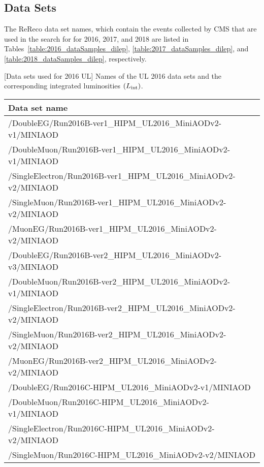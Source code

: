 \subsection{Data Sets}
\label{sec:datasets_dilep}
The ReReco data set names, which contain the events collected by CMS that are used in the search for \PZD for 2016, 2017, and 2018 are listed in Tables~\ref{table:2016_dataSamples_dilep}, \ref{table:2017_dataSamples_dilep}, and \ref{table:2018_dataSamples_dilep}, respectively.
\begin{table}[h]
    \small
    \centering
        [Data sets used for 2016 UL] %
        {Names of the UL 2016 data sets and the corresponding integrated luminosities $\left( L_\text{int} \right)$.} %
    \begin{tabular}{l}
		\hline      
        Data set name \\
        \hline
        /DoubleEG/Run2016B-ver1\_HIPM\_UL2016\_MiniAODv2-v1/MINIAOD \\
        /DoubleMuon/Run2016B-ver1\_HIPM\_UL2016\_MiniAODv2-v1/MINIAOD	\\
        /SingleElectron/Run2016B-ver1\_HIPM\_UL2016\_MiniAODv2-v2/MINIAOD	\\
        /SingleMuon/Run2016B-ver1\_HIPM\_UL2016\_MiniAODv2-v2/MINIAOD	\\
        /MuonEG/Run2016B-ver1\_HIPM\_UL2016\_MiniAODv2-v2/MINIAOD	\\
        \hline
        /DoubleEG/Run2016B-ver2\_HIPM\_UL2016\_MiniAODv2-v3/MINIAOD \\
        /DoubleMuon/Run2016B-ver2\_HIPM\_UL2016\_MiniAODv2-v1/MINIAOD	\\
        /SingleElectron/Run2016B-ver2\_HIPM\_UL2016\_MiniAODv2-v2/MINIAOD	\\
        /SingleMuon/Run2016B-ver2\_HIPM\_UL2016\_MiniAODv2-v2/MINIAOD	\\
        /MuonEG/Run2016B-ver2\_HIPM\_UL2016\_MiniAODv2-v2/MINIAOD	\\
        \hline
        /DoubleEG/Run2016C-HIPM\_UL2016\_MiniAODv2-v1/MINIAOD \\
        /DoubleMuon/Run2016C-HIPM\_UL2016\_MiniAODv2-v1/MINIAOD	\\
        /SingleElectron/Run2016C-HIPM\_UL2016\_MiniAODv2-v2/MINIAOD	\\
        /SingleMuon/Run2016C-HIPM\_UL2016\_MiniAODv2-v2/MINIAOD	\\

\end{tabular}
\end{table}
